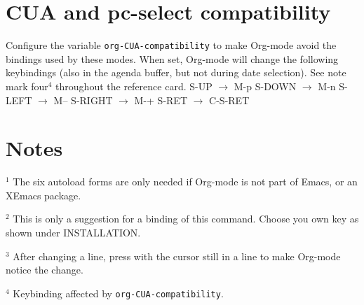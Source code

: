 \section{CUA and pc-select compatibility}

Configure the variable {\tt org-CUA-compatibility} to make Org-mode
avoid the  bindings used by these modes.  When set,
Org-mode will change the following keybindings (also in the agenda
buffer, but not during date selection). See note mark four$^4$
throughout the reference card.
\beginexample
S-UP    $\to$ M-p             S-DOWN  $\to$ M-n
S-LEFT  $\to$ M--             S-RIGHT $\to$ M-+
S-RET   $\to$ C-S-RET
\endexample

\section{Notes}
$^1$ The six autoload forms are only needed if Org-mode is not part of
Emacs, or an XEmacs package.

$^2$ This is only a suggestion for a binding of this command.  Choose
you own key as shown under INSTALLATION.

$^3$ After changing a  line, press  with
the cursor still in a line to make Org-mode notice the change.

$^4$ Keybinding affected by {\tt org-CUA-compatibility}.

\copyrightnotice

\bye



